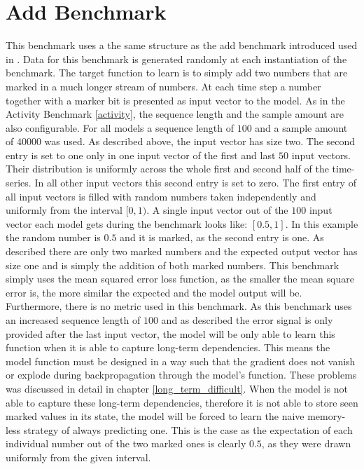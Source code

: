 \documentclass[draft,final]{vutinfth} %
\begin{document}
    \section{Add Benchmark} \label{add}
    This benchmark uses a the same structure as the add benchmark introduced used in \cite{UnitaryRNNs}.
    Data for this benchmark is generated randomly at each instantiation of the benchmark.
    The target function to learn is to simply add two numbers that are marked in a much longer stream of numbers.
    At each time step a number together with a marker bit is presented as input vector to the model.
    As in the Activity Benchmark \ref{activity}, the sequence length and the sample amount are also configurable.
    For all models a sequence length of $100$ and a sample amount of $40000$ was used.
    As described above, the input vector has size two.
    The second entry is set to one only in one input vector of the first and last $50$ input vectors.
    Their distribution is uniformly across the whole first and second half of the time-series.
    In all other input vectors this second entry is set to zero. 
    The first entry of all input vectors is filled with random numbers taken independently and uniformly from the interval $[0,1)$.
    A single input vector out of the $100$ input vector each model gets during the benchmark looks like: $[0.5,1]$.
    In this example the random number is $0.5$ and it is marked, as the second entry is one.
    As described there are only two marked numbers and the expected output vector has size one and is simply the addition of both marked numbers.
    This benchmark simply uses the mean squared error loss function, as the smaller the mean square error is, the more similar the expected and the model output will be.
    Furthermore, there is no metric used in this benchmark.
    As this benchmark uses an increased sequence length of $100$ and as described the error signal is only provided after the last input vector, the model will be only able to learn this function when it is able to capture long-term dependencies.
    This means the model function must be designed in a way such that the gradient does not vanish or explode during backpropagation through the model's function.
    These problems was discussed in detail in chapter \ref{long_term_difficult}.
    When the model is not able to capture these long-term dependencies, therefore it is not able to store seen marked values in its state, the model will be forced to learn the naive memory-less strategy of always predicting one.
    This is the case as the expectation of each individual number out of the two marked ones is clearly $0.5$, as they were drawn uniformly from the given interval.
\end{document}
